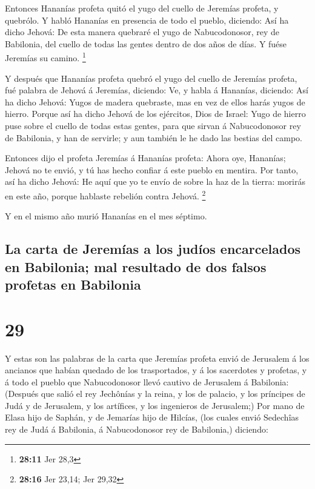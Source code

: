  Entonces Hananías profeta quitó el yugo del cuello de
Jeremías profeta, y quebrólo.  Y habló Hananías en
presencia de todo el pueblo, diciendo: Así ha dicho Jehová: De esta
manera quebraré el yugo de Nabucodonosor, rey de Babilonia, del cuello
de todas las gentes dentro de dos años de días. Y fuése Jeremías su
camino. \footnote{\textbf{28:11} Jer 28,3}

 Y después que Hananías profeta quebró el yugo del cuello
de Jeremías profeta, fué palabra de Jehová á Jeremías, diciendo:
 Ve, y habla á Hananías, diciendo: Así ha dicho Jehová:
Yugos de madera quebraste, mas en vez de ellos harás yugos de hierro.
 Porque así ha dicho Jehová de los ejércitos, Dios de
Israel: Yugo de hierro puse sobre el cuello de todas estas gentes, para
que sirvan á Nabucodonosor rey de Babilonia, y han de servirle; y aun
también le he dado las bestias del campo.

 Entonces dijo el profeta Jeremías á Hananías profeta:
Ahora oye, Hananías; Jehová no te envió, y tú has hecho confiar á este
pueblo en mentira.  Por tanto, así ha dicho Jehová: He aquí
que yo te envío de sobre la haz de la tierra: morirás en este año,
porque hablaste rebelión contra Jehová. \footnote{\textbf{28:16} Jer
  23,14; Jer 29,32}

 Y en el mismo año murió Hananías en el mes séptimo.

\hypertarget{la-carta-de-jeremuxedas-a-los-juduxedos-encarcelados-en-babilonia-mal-resultado-de-dos-falsos-profetas-en-babilonia}{%
\subsection{La carta de Jeremías a los judíos encarcelados en Babilonia;
mal resultado de dos falsos profetas en
Babilonia}\label{la-carta-de-jeremuxedas-a-los-juduxedos-encarcelados-en-babilonia-mal-resultado-de-dos-falsos-profetas-en-babilonia}}

\hypertarget{section-28}{%
\section{29}\label{section-28}}

 Y estas son las palabras de la carta que Jeremías profeta
envió de Jerusalem á los ancianos que habían quedado de los
trasportados, y á los sacerdotes y profetas, y á todo el pueblo que
Nabucodonosor llevó cautivo de Jerusalem á Babilonia: 
(Después que salió el rey Jechônías y la reina, y los de palacio, y los
príncipes de Judá y de Jerusalem, y los artífices, y los ingenieros de
Jerusalem;)  Por mano de Elasa hijo de Saphán, y de Jemarías
hijo de Hilcías, (los cuales envió Sedechîas rey de Judá á Babilonia, á
Nabucodonosor rey de Babilonia,) diciendo:

